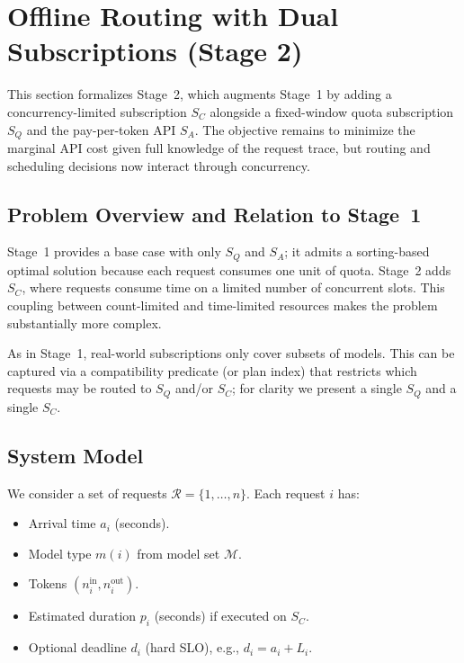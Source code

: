\documentclass[11pt]{article}
\begin{document}
\section{Offline Routing with Dual Subscriptions (Stage 2)}
\label{sec:offline-stage2}

This section formalizes Stage~2, which augments Stage~1 by adding a
concurrency-limited subscription \(S_C\) alongside a fixed-window quota subscription
\(S_Q\) and the pay-per-token API \(S_A\). The objective remains to minimize the
marginal API cost given full knowledge of the request trace, but routing and
scheduling decisions now interact through concurrency.

\subsection{Problem Overview and Relation to Stage~1}
Stage~1 provides a base case with only \(S_Q\) and \(S_A\); it admits a sorting-based
optimal solution because each request consumes one unit of quota. Stage~2 adds
\(S_C\), where requests consume time on a limited number of concurrent slots.
This coupling between count-limited and time-limited resources makes the problem
substantially more complex.

As in Stage~1, real-world subscriptions only cover subsets of models. This can be
captured via a compatibility predicate (or plan index) that restricts which requests
may be routed to \(S_Q\) and/or \(S_C\); for clarity we present a single \(S_Q\) and a
single \(S_C\).

\subsection{System Model}
We consider a set of requests \(\mathcal{R} = \{1,\dots,n\}\). Each request \(i\) has:
\begin{itemize}
  \item Arrival time \(a_i\) (seconds).
  \item Model type \(m(i)\) from model set \(\mathcal{M}\).
  \item Tokens \((n_i^{\text{in}}, n_i^{\text{out}})\).
  \item Estimated duration \(p_i\) (seconds) if executed on \(S_C\).
  \item Optional deadline \(d_i\) (hard SLO), e.g., \(d_i = a_i + L_i\).
\end{itemize}
\end{document}
